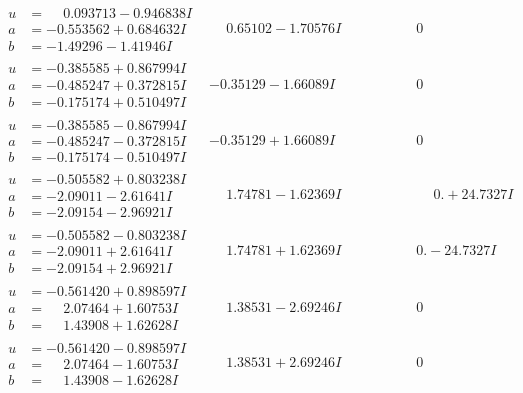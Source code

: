 \documentclass[1p]{elsarticle_modified}
\theoremstyle{definition}
\begin{document}
$$\begin{array}{c|c|c}
\begin{aligned}
u &= \phantom{-}0.093713 - 0.946838 I \\
a &= -0.553562 + 0.684632 I \\
b &= -1.49296 - 1.41946 I\end{aligned}
 & \phantom{-}0.65102 - 1.70576 I & \phantom{-0.000000 } 0 \\ \hline\begin{aligned}
u &= -0.385585 + 0.867994 I \\
a &= -0.485247 + 0.372815 I \\
b &= -0.175174 + 0.510497 I\end{aligned}
 & -0.35129 - 1.66089 I & \phantom{-0.000000 } 0 \\ \hline\begin{aligned}
u &= -0.385585 - 0.867994 I \\
a &= -0.485247 - 0.372815 I \\
b &= -0.175174 - 0.510497 I\end{aligned}
 & -0.35129 + 1.66089 I & \phantom{-0.000000 } 0 \\ \hline\begin{aligned}
u &= -0.505582 + 0.803238 I \\
a &= -2.09011 - 2.61641 I \\
b &= -2.09154 - 2.96921 I\end{aligned}
 & \phantom{-}1.74781 - 1.62369 I & \phantom{-0.000000 -}0. + 24.7327 I \\ \hline\begin{aligned}
u &= -0.505582 - 0.803238 I \\
a &= -2.09011 + 2.61641 I \\
b &= -2.09154 + 2.96921 I\end{aligned}
 & \phantom{-}1.74781 + 1.62369 I & \phantom{-0.000000 } 0. - 24.7327 I \\ \hline\begin{aligned}
u &= -0.561420 + 0.898597 I \\
a &= \phantom{-}2.07464 + 1.60753 I \\
b &= \phantom{-}1.43908 + 1.62628 I\end{aligned}
 & \phantom{-}1.38531 - 2.69246 I & \phantom{-0.000000 } 0 \\ \hline\begin{aligned}
u &= -0.561420 - 0.898597 I \\
a &= \phantom{-}2.07464 - 1.60753 I \\
b &= \phantom{-}1.43908 - 1.62628 I\end{aligned}
 & \phantom{-}1.38531 + 2.69246 I & \phantom{-0.000000 } 0 \\ \hline\begin{aligned}

\end{aligned}
\end{array}$$
\end{document}
